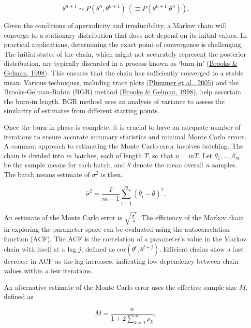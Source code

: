 \documentclass[
  11pt,
]{article}
\begin{document}
\begin{equation}
\theta^{n+1} \sim P(\theta^n, \theta^{n+1}) \, (\equiv P(\theta^{n+1}|\theta^n)).
\end{equation}

Given the conditions of aperiodicity and irreducibility, a Markov chain
will converge to a stationary distribution that does not depend on its
initial values. In practical applications, determining the exact point
of convergence is challenging. The initial states of the chain, which
might not accurately represent the posterior distribution, are typically
discarded in a process known as `burn-in'
(\protect\hyperlink{ref-Brooks1998}{Brooks \& Gelman, 1998}). This
ensures that the chain has sufficiently converged to a stable mean.
Various techniques, including trace plots
(\protect\hyperlink{ref-Plummer2005}{Plummer et al., 2005}) and the
Brooks-Gelman-Rubin (BGR) method
(\protect\hyperlink{ref-Brooks1998}{Brooks \& Gelman, 1998}), help
ascertain the burn-in length. BGR method uses an analysis of variance to
assess the similarity of estimates from different starting points.

Once the burn-in phase is complete, it is crucial to have an adequate
number of iterations to ensure accurate summary statistics and minimal
Monte Carlo errors. A common approach to estimating the Monte Carlo
error involves batching. The chain is divided into \(m\) batches, each
of length \(T\), so that \(n = mT\). Let \(\theta_1,\ldots,\theta_m\) be
the sample means for each batch, and \(\theta\) denote the mean overall
\(n\) samples. The batch means estimate of \(\sigma^2\) is then,

\begin{equation}
\hat{\sigma}^2 = \frac{T}{m - 1} \sum_{i=1}^{m}(\bar{\theta}_i - \bar{\theta})^2.
\end{equation}

An estimate of the Monte Carlo error is
\(\sqrt{\frac{\hat{\sigma}^2}{n}}\). The efficiency of the Markov chain
in exploring the parameter space can be evaluated using the
autocorrelation function (ACF). The ACF is the correlation of a
parameter's value in the Markov chain with itself at a lag \(j\),
defined as \(\text{cor}(\theta^t, \theta^{t+j})\). Efficient chains show
a fast decrease in ACF as the lag increases, indicating low dependency
between chain values within a few iterations.

An alternative estimate of the Monte Carlo error uses the effective
sample size \(M\), defined as

\begin{equation}
M = \frac{n}{1 + 2 \sum_{k=1}^{\infty} \rho_k},
\end{equation}
\end{document}
